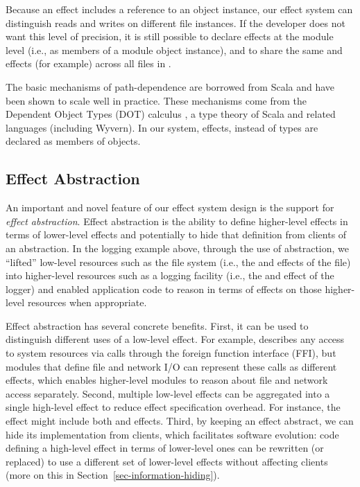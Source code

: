 Because an effect includes a reference to an object instance, our effect system can distinguish reads and writes on different file instances. If the developer does not want this level of precision, it is still possible to declare effects at the module level (i.e., as members of a  module object instance), and to share the same  and  effects (for example) across all files in .

The basic mechanisms of path-dependence are borrowed from Scala and have been shown to scale well in practice. These mechanisms come from the Dependent Object Types (DOT) calculus \cite{amin14}, a type theory of Scala and related languages (including Wyvern). In our system, effects, instead of types are declared as members of objects.

\subsection{Effect Abstraction}
\label{sec:effect-abstraction}

An important and novel feature of our effect system design is the support for \textit{effect abstraction}. Effect abstraction is the ability to define higher-level effects in terms of lower-level effects and potentially to hide that definition from clients of an abstraction. In the logging example above, through the use of abstraction, we ``lifted'' low-level resources such as the file system (i.e., the  and  effects of the file) into higher-level resources such as a logging facility (i.e., the  and  effect of the logger) and enabled application code to reason in terms of effects on those higher-level resources when appropriate.

Effect abstraction has several concrete benefits. First, it can be used to distinguish different uses of a low-level effect. For example,  describes any access to system resources via calls through the foreign function interface (FFI), but modules that define file and network I/O can represent these calls as different effects, which enables higher-level modules to reason about file and network access separately. Second, multiple low-level effects can be aggregated into a single high-level effect to reduce effect specification overhead. For instance, the  effect might include both  and  effects. Third, by keeping an effect abstract, we can hide its implementation from clients, which facilitates software evolution: code defining a high-level effect in terms of lower-level ones can be rewritten (or replaced) to use a different set of lower-level effects without affecting clients (more on this in Section~\ref{sec-information-hiding}).


